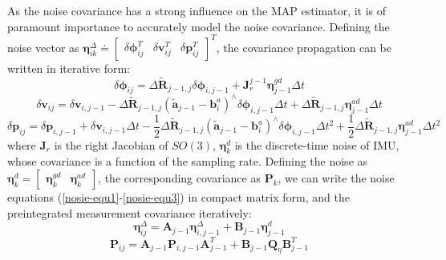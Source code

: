 \documentclass[journal,article,submit,moreauthors,pdftex]{Definitions/mdpi}
\begin{document}
As the noise covariance has a strong influence on the MAP estimator, 
it is of paramount importance to accurately model the noise covariance. 
Defining the noise vector as $ \boldsymbol{\eta}_{ik}^{\Delta} \doteq \left[\begin{matrix} \delta{\boldsymbol{\phi}_{ij}^T} & \delta{\boldsymbol{v}_{ij}^T} & \delta{\boldsymbol{p}_{ij}^T} \end{matrix}\right]^T $, the covariance propagation can be written in iterative form:
\begin{equation}
	\delta{\boldsymbol{\phi}_{ij}} = \Delta{\widetilde{\boldsymbol{R}}_{j-1,j}}\delta{\boldsymbol{\phi}_{i,j-1}} + \boldsymbol{J}_r^{j-1} \boldsymbol{\eta}_{j-1}^{gd}\Delta{t} 
	\label{nosie-equ1}
\end{equation}
\begin{equation}
	\delta{\boldsymbol{v}_{ij}} = \delta{\boldsymbol{v}_{i,j-1}} - \Delta{\widetilde{\boldsymbol{R}}_{j-1,j}}(\widetilde{\boldsymbol{a}}_{j-1}-\boldsymbol{b}_i^a)^{\land}\delta{\boldsymbol{\phi}_{i,j-1}}\Delta{t} + \Delta{\widetilde{\boldsymbol{R}}_{j-1,j}}\boldsymbol{\eta}_{j-1}^{ad}\Delta{t}
	\label{nosie-equ2}
\end{equation}
\begin{equation}
	\delta{\boldsymbol{p}_{ij}} = \delta{\boldsymbol{p}_{i,j-1}} + \delta{\boldsymbol{v}_{i,j-1}}\Delta{t}  - 
	\frac{1}{2}\Delta{\widetilde{\boldsymbol{R}}_{j-1,j}}(\widetilde{\boldsymbol{a}}_{j-1}-\boldsymbol{b}_i^a)^{\land}\delta{\boldsymbol{\phi}_{i,j-1}}\Delta{t}^2 + 
	\frac{1}{2}\Delta{\widetilde{\boldsymbol{R}}_{j-1,j}}\boldsymbol{\eta}_{j-1}^{ad}\Delta{t}^2
	\label{nosie-equ3}
\end{equation}
where $\boldsymbol{J}_r$ is the right Jacobian of $SO(3)$, $\boldsymbol{\eta}_{k}^{d}$ is the  discrete-time noise of IMU, whose covariance is a function of the sampling rate. 
Defining the noise as $\boldsymbol{\eta}_{k}^{d} = \left[ \begin{matrix} \boldsymbol{\eta}_{k}^{gd} & \boldsymbol{\eta}_{k}^{ad}\end{matrix}\right]$, the corresponding covariance as $\boldsymbol{P}_{k}$, we can write the noise equations (\ref{nosie-equ1}-\ref{nosie-equ3}) in compact matrix form, and the preintegrated measurement covariance iteratively:
\begin{equation}
	\boldsymbol{\eta}_{ij}^{\Delta} = \boldsymbol{A}_{j-1}\boldsymbol{\eta}_{i,j-1}^{\Delta} + \boldsymbol{B}_{j-1} \boldsymbol{\eta}_{j-1}^{d}
\end{equation}
\begin{equation}
	\boldsymbol{P}_{ij} = \boldsymbol{A}_{j-1}\boldsymbol{P}_{i,j-1}\boldsymbol{A}_{j-1}^T + \boldsymbol{B}_{j-1} \boldsymbol{Q}_{\eta} \boldsymbol{B}_{j-1}^T
\end{equation}
\end{document}

